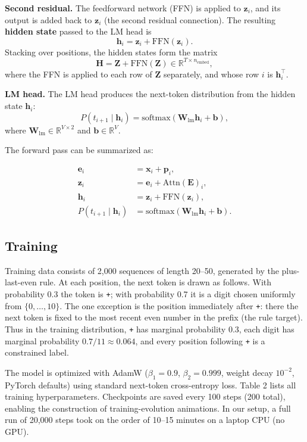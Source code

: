 \documentclass[
  11pt,
  a4paper,
]{article}
\begin{document}
\textbf{Second residual.} The feedforward network (FFN) is applied to
\(\mathbf{z}_i\), and its output is added back to \(\mathbf{z}_i\) (the
second residual connection). The resulting \textbf{hidden state} passed
to the LM head is \[
\mathbf{h}_i = \mathbf{z}_i + \mathrm{FFN}(\mathbf{z}_i).
\] Stacking over positions, the hidden states form the matrix \[
\mathbf{H} = \mathbf{Z} + \mathrm{FFN}(\mathbf{Z}) \in \mathbb{R}^{T \times n_{\mathrm{embed}}},
\] where the FFN is applied to each row of \(\mathbf{Z}\) separately,
and whose row \(i\) is \(\mathbf{h}_i^\top\).

\textbf{LM head.} The LM head produces the next-token distribution from
the hidden state \(\mathbf{h}_i\): \[
P(t_{i+1} \mid \mathbf{h}_i) = \mathrm{softmax}\!\left(\mathbf{W}_{\mathrm{lm}} \mathbf{h}_i + \mathbf{b}\right),
\] where \(\mathbf{W}_{\mathrm{lm}} \in \mathbb{R}^{V \times 2}\) and
\(\mathbf{b} \in \mathbb{R}^V\).

The forward pass can be summarized as:

\[
\begin{aligned}
\mathbf{e}_i &= \mathbf{x}_i + \mathbf{p}_i, \\
\mathbf{z}_i &= \mathbf{e}_i + \mathrm{Attn}(\mathbf{E})_i, \\
\mathbf{h}_i &= \mathbf{z}_i + \mathrm{FFN}(\mathbf{z}_i), \\
P(t_{i+1} \mid \mathbf{h}_i) &= \mathrm{softmax}\!\left(\mathbf{W}_{\mathrm{lm}} \mathbf{h}_i + \mathbf{b}\right).
\end{aligned}
\]

\subsection{Training}\label{training}

Training data consists of 2,000 sequences of length 20--50, generated by
the plus-last-even rule. At each position, the next token is drawn as
follows. With probability 0.3 the token is \texttt{+}; with probability
0.7 it is a digit chosen uniformly from \(\{0, \ldots, 10\}\). The one
exception is the position immediately after \texttt{+}: there the next
token is fixed to the most recent even number in the prefix (the rule
target). Thus in the training distribution, \texttt{+} has marginal
probability 0.3, each digit has marginal probability
\(0.7 / 11 \approx 0.064\), and every position following \texttt{+} is a
constrained label.

The model is optimized with AdamW (\(\beta_1 = 0.9\),
\(\beta_2 = 0.999\), weight decay \(10^{-2}\), PyTorch defaults) using
standard next-token cross-entropy loss. Table 2 lists all training
hyperparameters. Checkpoints are saved every 100 steps (200 total),
enabling the construction of training-evolution animations. In our
setup, a full run of 20,000 steps took on the order of 10--15 minutes on
a laptop CPU (no GPU).
\end{document}
